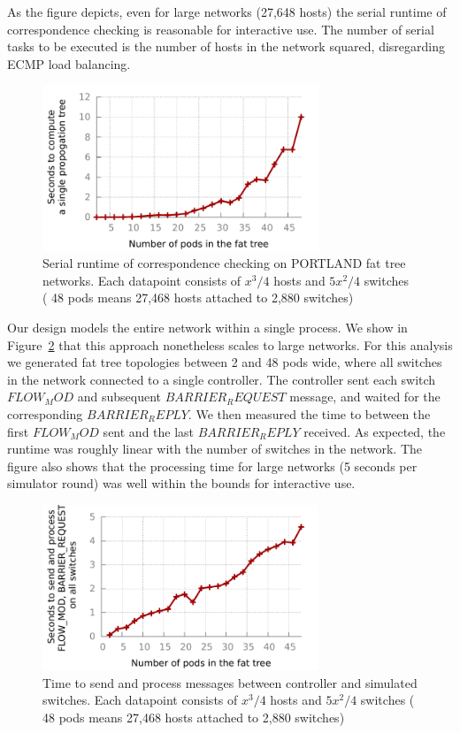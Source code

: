 As the figure depicts, even for large networks
(27,648 hosts) the serial runtime of correspondence checking is reasonable for
interactive use. The number of serial tasks to be executed
is the number of hosts in the network squared, disregarding ECMP load balancing.

\begin{figure}[t]
    \includegraphics[width=3.25in]{../graphs/hsa_overhead_graph/graph.pdf}
    \caption[]{\label{fig:hsa_runtime} Serial runtime of correspondence
    checking on PORTLAND fat tree networks. Each datapoint consists of
    $x^3/4$ hosts and $5x^2/4$ switches (\eg{} 48 pods means 27,468 hosts
    attached to 2,880 switches)}
\end{figure}

 Our design models the entire network
within a single process. We show in Figure~\ref{fig:scalability}
that this approach nonetheless scales to large networks. For this analysis we
generated fat tree topologies between 2 and 48 pods wide, where all switches in
the network connected to a single controller. The controller sent each switch
$FLOW_MOD$ and subsequent $BARRIER_REQUEST$ message, and waited for the
corresponding $BARRIER_REPLY$. We then measured the time to between the first
$FLOW_MOD$ sent and the last $BARRIER_REPLY$ received. As expected, the
runtime was roughly linear with the number of switches in the network. The
figure also shows that the processing time for large networks (5 seconds per
simulator round) was well within the bounds for interactive use.

\begin{figure}[t]
    \includegraphics[width=3.25in]{../graphs/scalability_graph/scale.pdf}
    \caption[]{\label{fig:scalability} Time to send and process messages
    between controller and simulated switches. Each datapoint consists of
    $x^3/4$ hosts and $5x^2/4$ switches (\eg{} 48 pods means 27,468 hosts
    attached to 2,880 switches)}
\end{figure}

